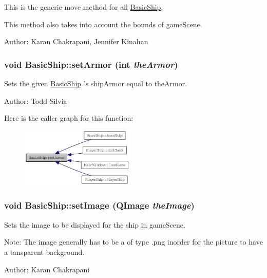 This is the generic move method for all \hyperlink{class_basic_ship}{BasicShip}.\par
 This method also takes into account the bounds of gameScene.

Author: Karan Chakrapani, Jennifer Kinahan \hypertarget{class_basic_ship_ad7fbff0029da6b55b5a5f60fcad4030f}{
\subsubsection[{setArmor}]{\setlength{\rightskip}{0pt plus 5cm}void BasicShip::setArmor (int {\em theArmor})}}
\label{class_basic_ship_ad7fbff0029da6b55b5a5f60fcad4030f}
Sets the given \hyperlink{class_basic_ship}{BasicShip} 's shipArmor equal to theArmor.

Author: Todd Silvia 

Here is the caller graph for this function:\nopagebreak
\begin{figure}[H]
\begin{center}
\leavevmode
\includegraphics[width=154pt]{class_basic_ship_ad7fbff0029da6b55b5a5f60fcad4030f_icgraph}
\end{center}
\end{figure}
\hypertarget{class_basic_ship_ad0dc07d6f5934c938efd31be0ca56a06}{
\subsubsection[{setImage}]{\setlength{\rightskip}{0pt plus 5cm}void BasicShip::setImage (QImage {\em theImage})}}
\label{class_basic_ship_ad0dc07d6f5934c938efd31be0ca56a06}
Sets the image to be displayed for the ship in gameScene.

Note: The image generally has to be a of type .png inorder for the picture to have a tansparent background.

Author: Karan Chakrapani 

